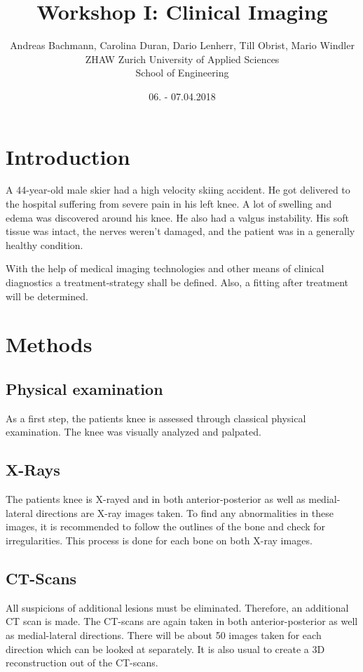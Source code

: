 \documentclass[a4paper]{article}
\title{Workshop I: Clinical Imaging}
\author{Andreas Bachmann, Carolina Duran, Dario Lenherr, Till Obrist, Mario Windler
	\\
	ZHAW Zurich University of Applied Sciences\\
	School of Engineering
}
\date{06. - 07.04.2018}
\begin{document}
	\maketitle
	
	\begin{multicols*}{2}
		\section{Introduction}
			A 44-year-old male skier had a high velocity skiing accident. He got delivered to the hospital suffering from
			severe pain in his left knee. A lot of swelling and edema was discovered around his knee. He also had a valgus
			instability. His soft tissue was intact, the nerves weren’t damaged, and the patient was in a generally healthy
			condition.
			
			With the help of medical imaging technologies and other means of clinical diagnostics a treatment-strategy
			shall be defined. Also, a fitting after treatment will be determined.
		
		\section{Methods}
			\subsection{Physical examination}
				As a first step, the patients knee is assessed through classical physical examination.
				The knee was visually analyzed and palpated.
				
			\subsection{X-Rays}
				The patients knee is X-rayed and in both anterior-posterior as well as medial-lateral directions are X-ray
				images taken. To find any abnormalities in these images, it is recommended to follow the outlines of the
				bone and check for irregularities. This process is done for each bone on both X-ray images.
								
			\subsection{CT-Scans}
				All suspicions of additional lesions must be eliminated. Therefore, an additional CT scan is made.
				The CT-scans are again taken in both anterior-posterior as well as medial-lateral directions. There will
				be about 50 images taken for each direction which can be looked at separately. It is also usual to create
				a 3D reconstruction out of the CT-scans.
				

\end{multicols*}
\end{document}
